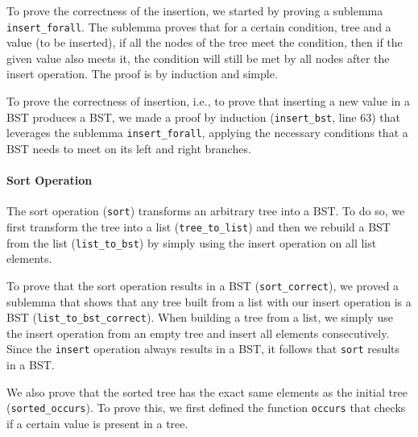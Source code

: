 \documentclass[a4paper]{article}
\begin{document}
To prove the correctness of the insertion, we started by proving a sublemma \texttt{insert\_forall}. The sublemma proves that for a certain condition, tree and a value (to be inserted), if all the nodes of the tree meet the condition, then if the given value also meets it, the condition will still be met by all nodes after the insert operation. The proof is by induction and simple.



To prove the correctness of insertion, i.e., to prove that inserting a new value in a BST produces a BST, we made a proof by induction (\texttt{insert\_bst}, line 63) that leverages the sublemma \texttt{insert\_forall}, applying the necessary conditions that a BST needs to meet on its left and right branches.



\paragraph{Sort Operation}

The sort operation (\texttt{sort}) transforms an arbitrary tree into a BST. To do so, we first transform the tree into a list (\texttt{tree\_to\_list}) and then we rebuild a BST from the list (\texttt{list\_to\_bst}) by simply using the insert operation on all list elements.



To prove that the sort operation results in a BST (\texttt{sort\_correct}), we proved a sublemma that shows that any tree built from a list with our insert operation is a BST (\texttt{list\_to\_bst\_correct}). When building a tree from a list, we simply use the insert operation from an empty tree and insert all elements consecutively. Since the \texttt{insert} operation always results in a BST, it follows that \texttt{sort} results in a BST.



We also prove that the sorted tree has the exact same elements as the initial tree (\texttt{sorted\_occurs}). To prove this, we first defined the function \texttt{occurs} that checks if a certain value is present in a tree.


\end{document}
